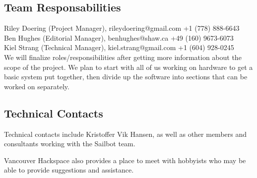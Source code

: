 \subsection{\label{sec:responsabilities:team}Team Responsabilities}
Riley Doering (Project Manager), rileydoering@gmail.com +1 (778) 888-6643\\
Ben Hughes (Editorial Manager), benhughes@shaw.ca +49 (160) 9673-6073\\
Kiel Strang (Technical Manager), kiel.strang@gmail.com +1 (604) 928-0245\\

We will finalize roles/responsibilities after getting more information about the scope of the project.  We plan to start with all of us working on hardware to get a basic system put together, then divide up the software into sections that can be worked on separately.

\subsection{\label{sec:responsabilities:technical-contacts}Technical Contacts}
Technical contacts include Kristoffer Vik Hansen, as well as other members and consultants working with the Sailbot team.

Vancouver Hackspace also provides a place to meet with hobbyists who may be able to provide suggestions and assistance.
